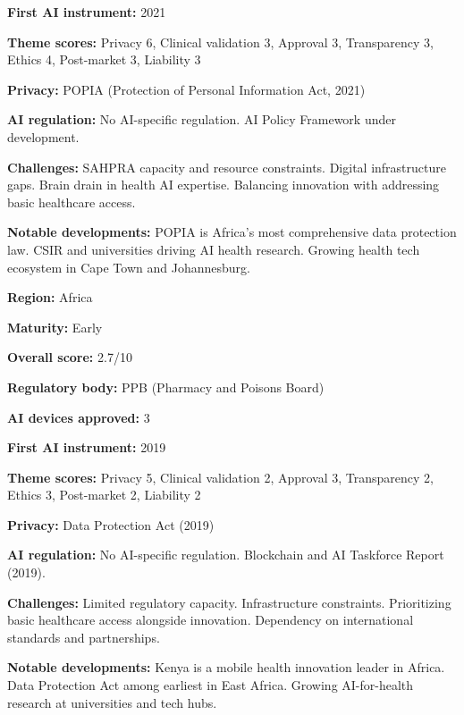 \noindent\textbf{First AI instrument:} 2021\par
\noindent\textbf{Theme scores:} Privacy 6, Clinical validation 3, Approval 3, Transparency 3, Ethics 4, Post-market 3, Liability 3\par
\noindent\textbf{Privacy:} POPIA (Protection of Personal Information Act, 2021)\par
\noindent\textbf{AI regulation:} No AI-specific regulation. AI Policy Framework under development.\par
\noindent\textbf{Challenges:} SAHPRA capacity and resource constraints. Digital infrastructure gaps. Brain drain in health AI expertise. Balancing innovation with addressing basic healthcare access.\par
\noindent\textbf{Notable developments:} POPIA is Africa's most comprehensive data protection law. CSIR and universities driving AI health research. Growing health tech ecosystem in Cape Town and Johannesburg.\par
\vspace{0.55em}
\par
\vspace{0.15em}
\noindent\textbf{Region:} Africa\par
\noindent\textbf{Maturity:} Early\par
\noindent\textbf{Overall score:} 2.7/10\par
\noindent\textbf{Regulatory body:} PPB (Pharmacy and Poisons Board)\par
\noindent\textbf{AI devices approved:} 3\par
\noindent\textbf{First AI instrument:} 2019\par
\noindent\textbf{Theme scores:} Privacy 5, Clinical validation 2, Approval 3, Transparency 2, Ethics 3, Post-market 2, Liability 2\par
\noindent\textbf{Privacy:} Data Protection Act (2019)\par
\noindent\textbf{AI regulation:} No AI-specific regulation. Blockchain and AI Taskforce Report (2019).\par
\noindent\textbf{Challenges:} Limited regulatory capacity. Infrastructure constraints. Prioritizing basic healthcare access alongside innovation. Dependency on international standards and partnerships.\par
\noindent\textbf{Notable developments:} Kenya is a mobile health innovation leader in Africa. Data Protection Act among earliest in East Africa. Growing AI-for-health research at universities and tech hubs.\par
